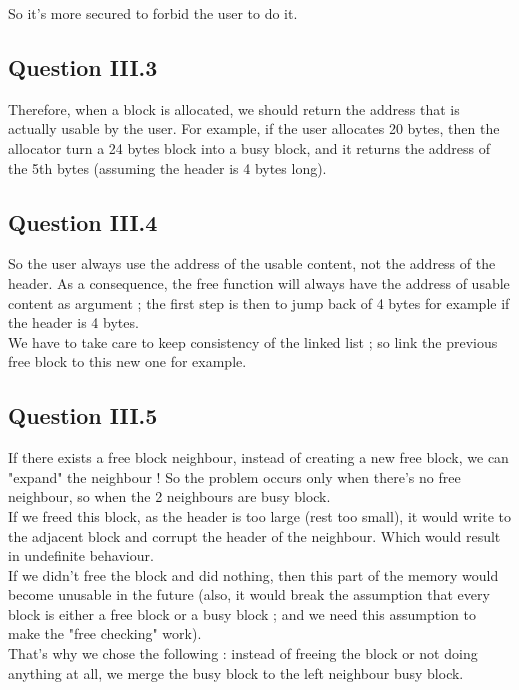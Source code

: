 \documentclass[twoside]{article}
\begin{document}
So it's more secured to forbid the user to do it.

\subsection{Question III.3}
Therefore, when a block is allocated, we should return the address that is
actually usable by the user. For example, if the user allocates 20 bytes, then
the allocator turn a 24 bytes block into a busy block, and it returns the
address of the 5th bytes (assuming the header is 4 bytes long).

\subsection{Question III.4}
So the user always use the address of the usable content, not the address of
the header. As a consequence, the free function will always have the address
of usable content as argument ; the first step is then to jump back of 4
bytes for example if the header is 4 bytes.\\

We have to take care to keep consistency of the linked list ; so link the
previous free block to this new one for example.

\subsection{Question III.5}
If there exists a free block neighbour, instead of creating a new free
block, we can "expand" the neighbour ! So the problem occurs only when there's
no free neighbour, so when the 2 neighbours are busy block.\\

If we freed this block, as the header is too large (rest too small), it would
write to the adjacent block and corrupt the header of the neighbour. Which
would result in undefinite behaviour.\\

If we didn't free the block and did nothing, then this part of the memory would
become unusable in the future (also, it would break the assumption that every
block is either a free block or a busy block ; and we need this assumption to
make the "free checking" work).\\

That's why we chose the following : instead of freeing the block or not doing
anything at all, we merge the busy block to the left neighbour busy block.
\end{document}
